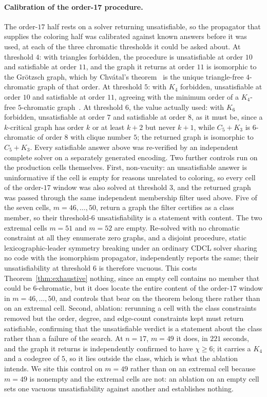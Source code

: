 \documentclass[11pt]{article}
\theoremstyle{definition}
\newcommand{\chrom}{\chi}
\begin{document}
\paragraph{Calibration of the order-17 procedure.} The order-$17$ half rests on a
solver returning unsatisfiable, so the propagator that supplies the coloring half
was calibrated against known answers before it was used, at each of the three
chromatic thresholds it could be asked about. At threshold $4$: with triangles
forbidden, the procedure is unsatisfiable at order $10$ and satisfiable at order
$11$, and the graph it returns at order $11$ is isomorphic to the Gr\"otzsch graph,
which by Chv\'atal's theorem~\cite{Chvatal1974} is the unique triangle-free
$4$-chromatic graph of that order. At threshold $5$: with $K_4$ forbidden, unsatisfiable at order $10$ and
satisfiable at order $11$, agreeing with the minimum order of a $K_4$-free
$5$-chromatic graph~\cite{JensenRoyle1995}. At threshold $6$, the value actually
used: with $K_6$ forbidden, unsatisfiable at order $7$ and satisfiable at order
$8$, as it must be, since a $k$-critical graph has order $k$ or at least $k+2$ but
never $k+1$, while $C_5 + K_3$ is $6$-chromatic of order $8$ with clique number
$5$; the returned graph is isomorphic to $C_5 + K_3$. Every satisfiable answer
above was re-verified by an independent complete solver on a separately generated
encoding. Two further controls run on the production cells themselves. First,
non-vacuity: an unsatisfiable answer is uninformative if the cell is empty for
reasons unrelated to coloring, so every cell of the order-$17$ window was also
solved at threshold $3$, and the returned graph was passed through the same
independent membership filter used above. Five of the seven cells,
$m = 46, \dots, 50$, return a graph the filter certifies as a class member, so
their threshold-$6$ unsatisfiability is a statement with content. The two
extremal cells $m = 51$ and $m = 52$ are empty. Re-solved with no chromatic
constraint at all they enumerate zero graphs, and a disjoint procedure, static
lexicographic-leader symmetry breaking under an ordinary CDCL solver sharing no
code with the isomorphism propagator, independently reports the same; their
unsatisfiability at threshold $6$ is therefore vacuous. This costs
Theorem~\ref{thm:exhaustive} nothing, since an empty cell contains no member
that could be $6$-chromatic, but it does locate the entire content of the
order-$17$ window in $m = 46, \dots, 50$, and controls that bear on the theorem
belong there rather than on an extremal cell. Second, ablation: rerunning a cell
with the class constraints removed but the order, degree, and edge-count
constraints kept must return satisfiable, confirming that the unsatisfiable
verdict is a statement about the class rather than a failure of the search. At
$n = 17$, $m = 49$ it does, in $221$ seconds, and the graph it returns is
independently confirmed to have $\chrom \ge 6$; it carries a $K_4$ and a
codegree of $5$, so it lies outside the class, which is what the ablation
intends. We site this control on $m = 49$ rather than on an extremal cell
because $m = 49$ is nonempty and the extremal cells are not: an ablation on an
empty cell sets one vacuous unsatisfiability against another and establishes
nothing.
\end{document}
